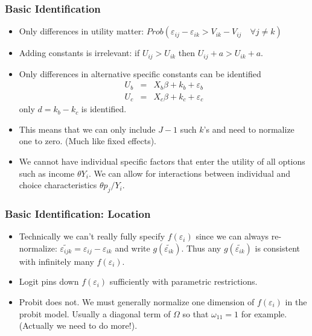 \documentclass[xcolor=pdftex,dvipsnames,table,mathserif,aspectratio=169]{beamer}
\begin{document}
\begin{frame}
\frametitle{Basic Identification}
\small
\begin{itemize}
\item Only differences in utility matter: $Prob( \varepsilon_{ij}-\varepsilon_{ik} > V_{ik} - V_{ij} \quad \forall j \neq k)$
\item Adding constants is irrelevant: if $U_{ij} > U_{ik}$ then $U_{ij} + a > U_{ik} + a$.
\item Only differences in alternative specific constants can be identified
\begin{eqnarray*}
U_b &=& X_b \beta + k_b  + \varepsilon_b\\
U_c &=& X_c \beta + k_c  + \varepsilon_c
\end{eqnarray*}
only $d = k_b - k_c$ is identified.
\item This means that we can only include $J-1$ such $k$'s and need to normalize one to zero. (Much like fixed effects).
\item We cannot have individual specific factors that enter the utility of all options such as income $\theta Y_i$. We can allow for interactions between individual and choice characteristics $\theta p_{j}/ Y_i$.
\end{itemize}
\end{frame}

\begin{frame}
\frametitle{Basic Identification: Location}
\begin{itemize}
\item Technically we can't really fully specify $f(\varepsilon_i)$ since we can always re-normalize: $\widetilde{\varepsilon_{ijk}} = \varepsilon_{ij} - \varepsilon_{ik}$ and write $g(\widetilde{\varepsilon_{ik}})$. Thus any $g(\widetilde{\varepsilon_{ik}})$ is consistent with infinitely many $f(\varepsilon_i)$.
\item Logit pins down $f(\varepsilon_i)$ sufficiently with parametric restrictions.
\item Probit does not. We must generally normalize one dimension of $f(\varepsilon_i)$ in the probit model. Usually a diagonal term of $\Omega$ so that $\omega_{11} =1$ for example. (Actually we need to do more!).
\end{itemize}
\end{frame}
\end{document}

